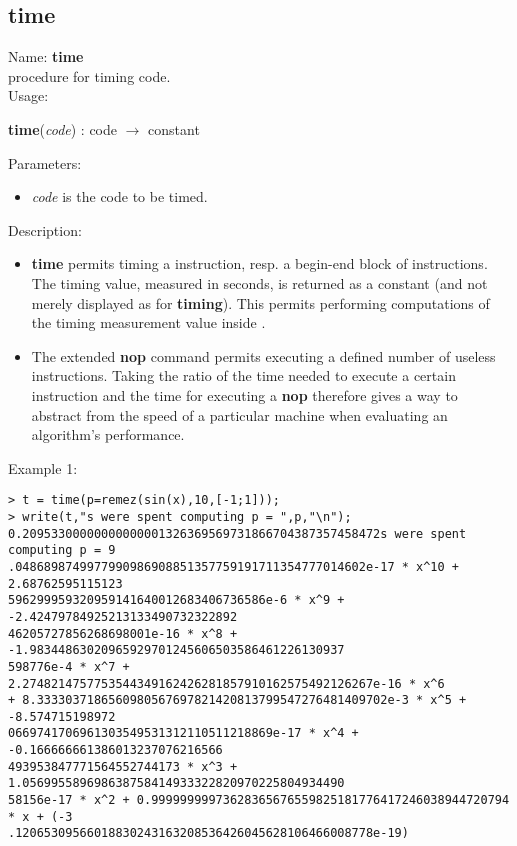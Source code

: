 \subsection{time}
\label{labtime}
\noindent Name: \textbf{time}\\
\phantom{aaa}procedure for timing \sollya code.\\[0.2cm]
\noindent Usage: 
\begin{center}
\textbf{time}(\emph{code}) : \textsf{code} $\rightarrow$ \textsf{constant}\\
\end{center}
Parameters: 
\begin{itemize}
\item \emph{code} is the code to be timed.
\end{itemize}
\noindent Description: \begin{itemize}

\item \textbf{time} permits timing a \sollya instruction, resp. a begin-end block
   of \sollya instructions. The timing value, measured in seconds, is returned
   as a \sollya constant (and not merely displayed as for \textbf{timing}). This 
   permits performing computations of the timing measurement value inside \sollya.

\item The extended \textbf{nop} command permits executing a defined number of
   useless instructions. Taking the ratio of the time needed to execute a
   certain \sollya instruction and the time for executing a \textbf{nop}
   therefore gives a way to abstract from the speed of a particular 
   machine when evaluating an algorithm's performance.
\end{itemize}
\noindent Example 1: 
\begin{center}\begin{minipage}{15cm}\begin{Verbatim}[frame=single]
> t = time(p=remez(sin(x),10,[-1;1]));
> write(t,"s were spent computing p = ",p,"\n");
0.20953300000000000001326369569731866704387357458472s were spent computing p = 9
.0486898749977990986908851357759191711354777014602e-17 * x^10 + 2.68762595115123
596299959320959141640012683406736586e-6 * x^9 + -2.42479784925213133490732322892
46205727856268698001e-16 * x^8 + -1.98344863020965929701245606503586461226130937
598776e-4 * x^7 + 2.2748214757753544349162426281857910162575492126267e-16 * x^6 
+ 8.3333037186560980567697821420813799547276481409702e-3 * x^5 + -8.574715198972
0669741706961303549531312110511218869e-17 * x^4 + -0.166666661386013237076216566
493953847771564552744173 * x^3 + 1.056995589698638758414933322820970225804934490
58156e-17 * x^2 + 0.99999999973628365676559825181776417246038944720794 * x + (-3
.12065309566018830243163208536426045628106466008778e-19)
\end{Verbatim}
\end{minipage}\end{center}
